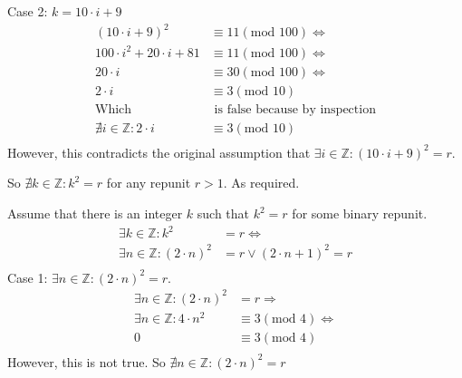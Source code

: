\documentclass[10pt,\jkfside,a4paper]{article}
\begin{document}
\begin{enumerate}
\begin{enumerate}
\begin{center}
Case 2: $k = 10\cdot i + 9$
\begin{equation}
\begin{split}
(10\cdot i + 9)^2 &\equiv 11(\text{mod } 100)\Longleftrightarrow\\
100\cdot i^2 + 20\cdot i + 81 &\equiv 11(\text{mod } 100)\Longleftrightarrow\\
20\cdot i &\equiv 30(\text{mod } 100)\Longleftrightarrow\\
2\cdot i &\equiv 3(\text{mod } 10)\\
\text{Which}&\text{ is false because by inspection}\\
\nexists i \in \mathbb{Z}: 2\cdot i &\equiv 3(\text{mod } 10)\\
\end{split}
\end{equation}
However, this contradicts the original assumption that $\exists i \in \mathbb{Z}: (10\cdot i + 9)^2 = r$.

So $\nexists k \in \mathbb{Z}: k^2 = r$ for any repunit $r > 1$. As required.

Assume that there is an integer $k$ such that $k^2 = r$ for some binary repunit.
\begin{equation}
\begin{split}
\exists k \in \mathbb{Z}: k^2 &= r\Longleftrightarrow\\
\exists n \in \mathbb{Z}: (2\cdot n)^2 &= r \vee (2\cdot n + 1)^2 = r\\
\end{split}
\end{equation}
Case 1: $\exists n \in \mathbb{Z}: (2\cdot n)^2 = r$.
\begin{equation}
\begin{split}
\exists n \in \mathbb{Z}: (2\cdot n)^2 &= r\Longrightarrow\\
\exists n \in \mathbb{Z}: 4\cdot n^2 &\equiv 3(\text{mod } 4)\Longleftrightarrow\\
0 &\equiv 3 (\text{mod } 4)\\
\end{split}
\end{equation}
However, this is not true. So $\nexists n \in \mathbb{Z}: (2\cdot n)^2 = r$


\end{center}
\end{enumerate}
\end{enumerate}
\end{document}
